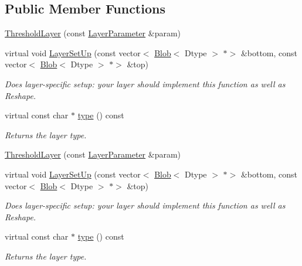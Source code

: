 \subsection*{Public Member Functions}
\begin{DoxyCompactItemize}
\item 
\mbox{\hyperlink{classcaffe_1_1_threshold_layer_a18883bf3cb9c29828acd59b8216ba1de}{Threshold\+Layer}} (const \mbox{\hyperlink{classcaffe_1_1_layer_parameter}{Layer\+Parameter}} \&param)
\item 
virtual void \mbox{\hyperlink{classcaffe_1_1_threshold_layer_a14e3782a6bea7bba511f3d6f23344037}{Layer\+Set\+Up}} (const vector$<$ \mbox{\hyperlink{classcaffe_1_1_blob}{Blob}}$<$ Dtype $>$ $\ast$$>$ \&bottom, const vector$<$ \mbox{\hyperlink{classcaffe_1_1_blob}{Blob}}$<$ Dtype $>$ $\ast$$>$ \&top)
\begin{DoxyCompactList}\small\item\em Does layer-\/specific setup\+: your layer should implement this function as well as Reshape. \end{DoxyCompactList}\item 
\mbox{\label{classcaffe_1_1_threshold_layer_ad1be0a529b7f18cc483115afe845ed59}} 
virtual const char $\ast$ \mbox{\hyperlink{classcaffe_1_1_threshold_layer_ad1be0a529b7f18cc483115afe845ed59}{type}} () const
\begin{DoxyCompactList}\small\item\em Returns the layer type. \end{DoxyCompactList}\item 
\mbox{\hyperlink{classcaffe_1_1_threshold_layer_a18883bf3cb9c29828acd59b8216ba1de}{Threshold\+Layer}} (const \mbox{\hyperlink{classcaffe_1_1_layer_parameter}{Layer\+Parameter}} \&param)
\item 
virtual void \mbox{\hyperlink{classcaffe_1_1_threshold_layer_a4902e90735cf20735343705014b4176f}{Layer\+Set\+Up}} (const vector$<$ \mbox{\hyperlink{classcaffe_1_1_blob}{Blob}}$<$ Dtype $>$ $\ast$$>$ \&bottom, const vector$<$ \mbox{\hyperlink{classcaffe_1_1_blob}{Blob}}$<$ Dtype $>$ $\ast$$>$ \&top)
\begin{DoxyCompactList}\small\item\em Does layer-\/specific setup\+: your layer should implement this function as well as Reshape. \end{DoxyCompactList}\item 
\mbox{\label{classcaffe_1_1_threshold_layer_ad1be0a529b7f18cc483115afe845ed59}} 
virtual const char $\ast$ \mbox{\hyperlink{classcaffe_1_1_threshold_layer_ad1be0a529b7f18cc483115afe845ed59}{type}} () const
\begin{DoxyCompactList}\small\item\em Returns the layer type. \end{DoxyCompactList}\end{DoxyCompactItemize}
